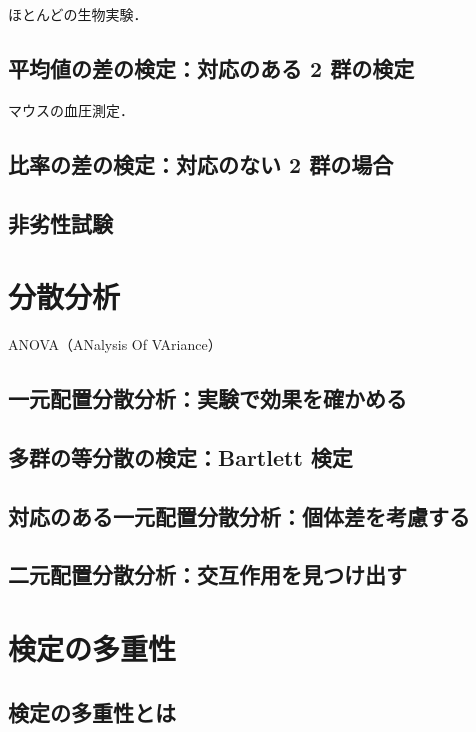 ほとんどの生物実験．

\section{平均値の差の検定：対応のある 2 群の検定}

マウスの血圧測定．

\section{比率の差の検定：対応のない 2 群の場合}
\section{非劣性試験}


\chapter{分散分析}

ANOVA（ANalysis Of VAriance）

\section{一元配置分散分析：実験で効果を確かめる}
\section{多群の等分散の検定：Bartlett 検定}
\section{対応のある一元配置分散分析：個体差を考慮する}
\section{二元配置分散分析：交互作用を見つけ出す}


\chapter{検定の多重性}

\section{検定の多重性とは}
